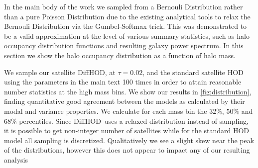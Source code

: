 \documentclass[a4paper,usenatbib]{mnras}
\newcommand{\dhod}{{\sc DiffHOD}}
\begin{document}
In the main body of the work we sampled from a Bernouli Distribution rather than a pure Poisson Distribution due to the existing analytical tools to relax the Bernouli Distribution via the Gumbel-Softmax trick. This was demonstrated to be a valid approximation at the level of various summary statistics, such as halo occupancy distribution functions and resulting galaxy power spectrum. In this section we show the halo occupancy distribution as a function of halo mass.

We sample our satellite \dhod, at $\tau=0.02$, and the standard satellite HOD using the parameters in the main text 100 times in order to attain reasonable number statistics at the high mass bins. We show our results in \ref{fig:distribution}, finding quantitative good agreement between the models as calculated by their modal and variance properties. We calculate for each mass bin the 32\%, 50\% and 68\% percentiles. Since \dhod\ uses a relaxed distribution instead of sampling, it is possible to get non-integer number of satellites while for the standard HOD model all sampling is discretized. Qualitatively we see a slight skew near the peak of the distributions, however this does not appear to impact any of our resulting analysis 



\bsp	%
\label{lastpage}
\end{document}

